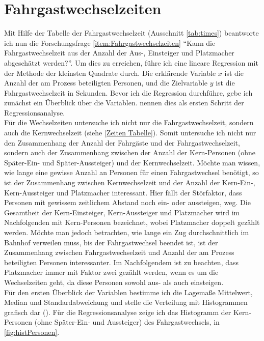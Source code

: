 \section{Fahrgastwechselzeiten} \label{Zeiten}
Mit Hilfe der Tabelle der Fahrgastwechselzeit (Ausschnitt \tablename \ref{tab:times}) beantworte ich nun die Forschungsfrage \ref{item:Fahrgastwechselzeiten} "`Kann die Fahrgastwechselzeit aus der Anzahl der Aus-, Einsteiger und Platzmacher abgeschätzt werden?"'. Um dies zu erreichen, führe ich eine lineare Regression mit der Methode der kleinsten Quadrate durch. Die erklärende Variable $x$ ist die Anzahl der am Prozess beteiligten Personen, und die Zielvariable $y$ ist die Fahrgastwechselzeit in Sekunden. Bevor ich die Regression durchführe, gebe ich zunächst ein Überblick über die Variablen. \cite{Fahrmeir.2009} nennen dies als ersten Schritt der Regressionsanalyse. \\
Für die Wechselzeiten untersuche ich nicht nur die Fahrgastwechselzeit, sondern auch die Kernwechselzeit (siehe \ref{Zeiten Tabelle}). Somit untersuche ich nicht nur den Zusammenhang der Anzahl der Fahrgäste und der Fahrgastwechselzeit, sondern auch der Zusammenhang zwischen der Anzahl der Kern-Personen (ohne Später-Ein- und Später-Aussteiger) und der Kernwechselzeit. Möchte man wissen, wie lange eine gewisse Anzahl an Personen für einen Fahrgastwechsel benötigt, so ist der Zusammenhang zwischen Kernwechselzeit und der Anzahl der Kern-Ein-, Kern-Aussteiger und Platzmacher interessant. Hier fällt der Störfaktor, dass Personen mit gewissem zeitlichem Abstand noch ein- oder aussteigen, weg. Die Gesamtheit der Kern-Einsteiger, Kern-Aussteiger und Platzmacher wird im Nachfolgenden mit Kern-Personen bezeichnet, wobei Platzmacher doppelt gezählt werden. Möchte man jedoch betrachten, wie lange ein Zug durchschnittlich im Bahnhof verweilen muss, bis der Fahrgastwechsel beendet ist, ist der Zusammenhang zwischen Fahrgastwechselzeit und Anzahl der am Prozess beteiligten Personen interessanter. Im Nachfolgendem ist zu beachten, dass Platzmacher immer mit Faktor zwei gezählt werden, wenn es um die Wechselzeiten geht, da diese Personen sowohl aus- als auch einsteigen.\\ 
Für den ersten Überblick der Variablen bestimme ich die Lagemaße Mittelwert, Median und Standardabweichung und stelle die Verteilung mit Histogrammen grafisch dar (\cite{Fahrmeir.2009}). Für die Regressionsanalyse zeige ich das Histogramm der Kern-Personen (ohne Später-Ein- und Aussteiger) des Fahrgastwechsels, in \figurename \ref{fig:histPersonen}.
